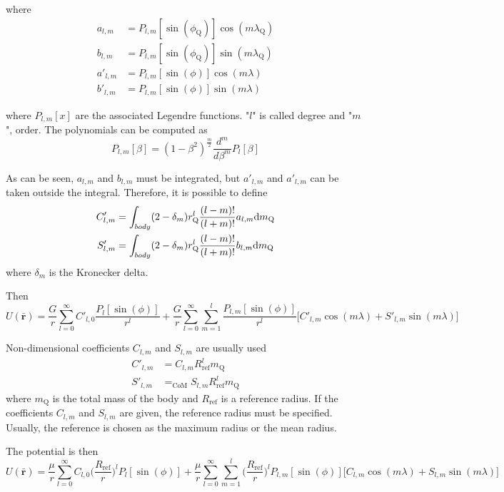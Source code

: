 where
\begin{align}
	a_{l,m} &= P_{l,m}[\sin(\phi_\text{Q})] \cos(m \lambda_\text{Q})\\
	b_{l,m} &= P_{l,m}[\sin(\phi_\text{Q})] \sin(m \lambda_\text{Q})\\
	a'_{l,m} &= P_{l,m}[\sin(\phi)] \cos(m \lambda)\\
	b'_{l,m} &= P_{l,m}[\sin(\phi)] \sin(m \lambda)
\end{align}

where $P_{l,m}[x]$ are the associated Legendre functions. "$l$" is called degree and "$m$", order. The polynomials can be computed as
\begin{equation}
P_{l,m}[\beta] = (1 - \beta^2)^\frac{m}{2} \frac{d^m}{d \beta^m} P_l[\beta]\label{eq:legendre}
\end{equation}

As can be seen, $a_{l,m}$ and $b_{l,m}$ must be integrated, but $a'_{l,m}$ and $a'_{l,m}$ can be taken outside the integral.
Therefore, it is possible to define
\begin{align}
	C'_{l,m} &= \int_{body} (2 -\delta_m) r_\text{Q}^l \frac{(l-m)!}{(l+m)!} a_{l,m} \D m_\text{Q}\\
	S'_{l,m} &= \int_{body} (2 -\delta_m) r_\text{Q}^l \frac{(l-m)!}{(l+m)!} b_{l,m} \D m_\text{Q}
\end{align}
where $\delta_m$ is the Kronecker delta.

Then
\begin{equation}
U(\mathbf{\bar r}) = \frac{G}{r} \sum_{l=0}^\infty C'_{l,0} \frac{P_l[\sin(\phi)]}{r^l} + \frac{G}{r} \sum_{l=0}^\infty \sum_{m=1}^l \frac{P_{l,m}[\sin(\phi)]}{r^l} \big[C'_{l,m} \cos(m \lambda) + S'_{l,m} \sin(m \lambda)]
\end{equation}

Non-dimensional coefficients $C_{l,m}$ and $S_{l,m}$ are usually used
\begin{align}
	C'_{l,m} &= C_{l,m} R_{\text{ref}}^l m_\text{Q}\\
	S'_{l,m} &= _\text{CoM}S_{l,m} R_{\text{ref}}^l m_\text{Q}
\end{align}
where $m_\text{Q}$ is the total mass of the body and $R_{\text{ref}}$ is a reference radius. If the coefficients $C_{l,m}$ and $S_{l,m}$ are given, the reference radius must be specified. Usually, the reference is chosen as the maximum radius or the mean radius\cite{scheeres2012}.

The potential is then
\begin{equation}
U(\mathbf{\bar r}) = \frac{\mu}{r} \sum_{l=0}^\infty C_{l,0} \bigg(\frac{R_{\text{ref}}}{r}\bigg)^l P_l[\sin(\phi)] + \frac{\mu}{r} \sum_{l=0}^\infty \sum_{m=1}^l \bigg(\frac{R_{\text{ref}}}{r}\bigg)^l P_{l,m}[\sin(\phi)] \big[C_{l,m} \cos(m \lambda) + S_{l,m} \sin(m \lambda)\big]
\end{equation}

